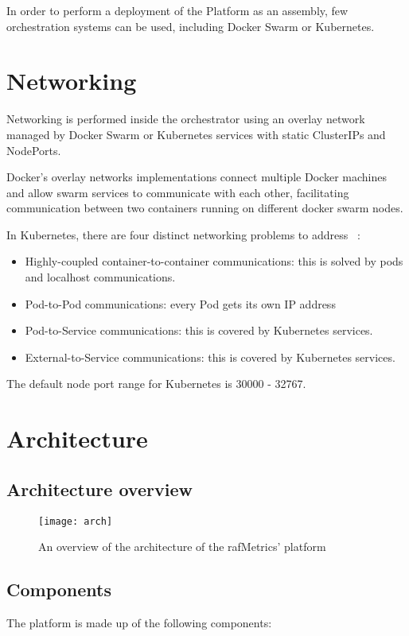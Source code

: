 In order to perform a deployment of the Platform as an assembly, few orchestration systems can be used, including Docker Swarm or Kubernetes.

\section{Networking}

Networking is performed inside the orchestrator using an overlay network managed by Docker Swarm or Kubernetes services with static ClusterIPs and NodePorts.

Docker's overlay networks implementations connect multiple Docker machines and allow swarm services to communicate with each other, facilitating communication between two containers running on
different docker swarm nodes.

In Kubernetes, there are four distinct networking problems to address ~\cite{authors2017kubernetes}:

\begin{itemize}
\item Highly-coupled container-to-container communications: this is solved by pods and localhost communications.
\item Pod-to-Pod communications: every Pod gets its own IP address
\item Pod-to-Service communications: this is covered by Kubernetes services.
\item External-to-Service communications: this is covered by Kubernetes services.
\end{itemize}

The default node port range for Kubernetes is 30000 - 32767.


\section{Architecture}

\subsection{Architecture overview}


\begin{figure}[H]
\centering
\texttt{[image: arch]}
\caption{An overview of the architecture of the rafMetrics' platform}
\end{figure}

\subsection{Components}
The platform is made up of the following components:

